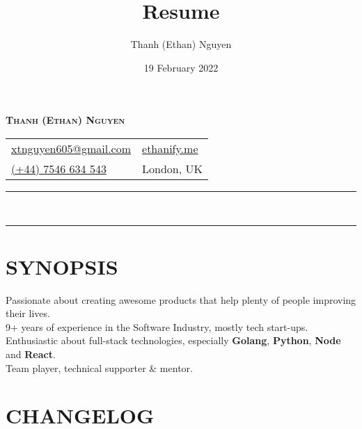 \newcommand{\primary}[1]{\textcolor{primary}{\textbf{#1}}}
\newcommand{\secondary}[1]{\textcolor{secondary}{\textbf{#1}}}
\newcommand{\tertiary}[1]{\textcolor{tertiary}{#1}}
\newcommand{\tbullet}{\textcolor{tertiary}{\textbf{$\bullet$ }}}
\newcommand{\at}{\textcolor{tertiary}{\textbf{@ }}}
\newcommand{\then}{\textcolor{tertiary}{\textbf{$\Rightarrow$ }}}

\title{Resume}
\author{Thanh (Ethan) Nguyen}
\date{19 February 2022}
\pagestyle{empty}


\setlength\parindent{0pt}
\pagecolor{background}
\color{foreground}

\begin{center}
  \textcolor{primary}{\LARGE\bfseries\scshape{Thanh (Ethan) Nguyen}}
\end{center}

\begin{tabularx}{\textwidth}{
    @{}
    >{\raggedright\arraybackslash}X
    >{\raggedleft\arraybackslash}X
    @{}
  }
  \href{mailto:xtnguyen605@gmail.com}{\textcolor{secondary}{xtnguyen605@gmail.com}} & \href{https://ethanify.me}{\textcolor{secondary}{ethanify.me}} \\
  \href{tel:447546634543}{(+44) 7546 634 543} & London, UK \\
\end{tabularx}

\begin{spacing}{0.05}
\rule{\textwidth}{1pt} \\
\rule{\textwidth}{1pt}
\end{spacing}

\section*{SYNOPSIS}

Passionate about creating awesome products that help plenty of people improving their lives. \\
9+ years of experience in the Software Industry, mostly tech start-ups. \\
Enthusiastic about full-stack technologies, especially \secondary{Golang}, \secondary{Python}, \secondary{Node} and \secondary{React}. \\
Team player, technical supporter \& mentor.

\section*{CHANGELOG}

